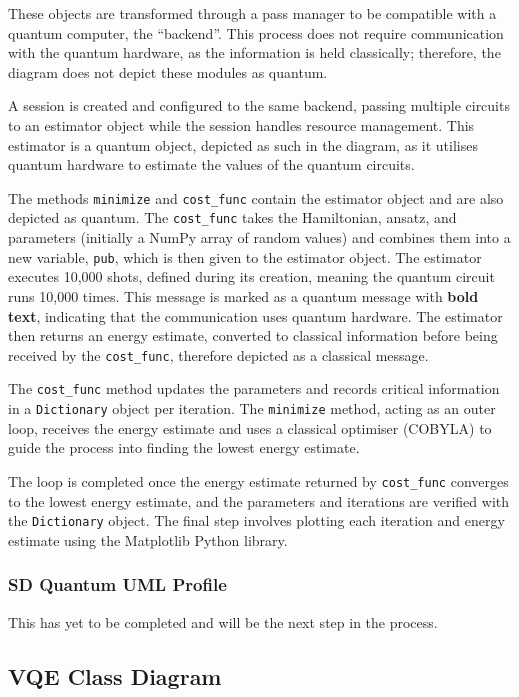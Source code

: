 \documentclass{article}
\begin{document}
{These objects are transformed through a pass manager to be compatible with a quantum computer, the “backend”. This process does not require communication with the quantum hardware, as the information is held classically; therefore, the diagram does not depict these modules as quantum.

A session is created and configured to the same backend, passing multiple circuits to an estimator object while the session handles resource management. This estimator is a quantum object, depicted as such in the diagram, as it utilises quantum hardware to estimate the values of the quantum circuits. 

The methods \texttt{minimize} and \texttt{cost\_func} contain the estimator object and are also depicted as quantum. The \texttt{cost\_func} takes the Hamiltonian, ansatz, and parameters (initially a NumPy array of random values) and combines them into a new variable, \texttt{pub}, which is then given to the estimator object. The estimator executes 10,000 shots, defined during its creation, meaning the quantum circuit runs 10,000 times. This message is marked as a quantum message with \textbf{bold text}, indicating that the communication uses quantum hardware. The estimator then returns an energy estimate, converted to classical information before being received by the \texttt{cost\_func}, therefore depicted as a classical message.

The \texttt{cost\_func} method updates the parameters and records critical information in a \texttt{Dictionary} object per iteration. The \texttt{minimize} method, acting as an outer loop, receives the energy estimate and uses a classical optimiser (COBYLA) to guide the process into finding the lowest energy estimate.

The loop is completed once the energy estimate returned by \texttt{cost\_func} converges to the lowest energy estimate, and the parameters and iterations are verified with the \texttt{Dictionary} object. The final step involves plotting each iteration and energy estimate using the Matplotlib Python library.

\subsubsection{SD Quantum UML Profile}

This has yet to be completed and will be the next step in the process.

\subsection{VQE Class Diagram}

}
\end{document}
